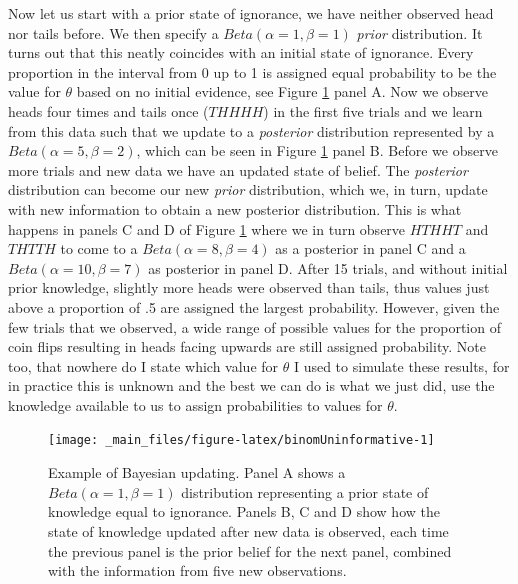 \documentclass[openright,titlepage,12pt,a4paper]{book}
\begin{document}
Now let us start with a prior state of ignorance, we have neither observed head nor tails before. We then specify a \(Beta(\alpha = 1, \beta = 1)\) \emph{prior} distribution. It turns out that this neatly coincides with an initial state of ignorance. Every proportion in the interval from 0 up to 1 is assigned equal probability to be the value for \(\theta\) based on no initial evidence, see Figure \ref{fig:binomUninformative} panel A. Now we observe heads four times and tails once (\(THHHH\)) in the first five trials and we learn from this data such that we update to a \emph{posterior} distribution represented by a \(Beta(\alpha = 5, \beta = 2)\), which can be seen in Figure \ref{fig:binomUninformative} panel B. Before we observe more trials and new data we have an updated state of belief. The \emph{posterior} distribution can become our new \emph{prior} distribution, which we, in turn, update with new information to obtain a new posterior distribution. This is what happens in panels C and D of Figure \ref{fig:binomUninformative} where we in turn observe \(HTHHT\) and \(THTTH\) to come to a \(Beta(\alpha = 8, \beta = 4)\) as a posterior in panel C and a \(Beta(\alpha = 10, \beta = 7)\) as posterior in panel D. After 15 trials, and without initial prior knowledge, slightly more heads were observed than tails, thus values just above a proportion of .5 are assigned the largest probability. However, given the few trials that we observed, a wide range of possible values for the proportion of coin flips resulting in heads facing upwards are still assigned probability. Note too, that nowhere do I state which value for \(\theta\) I used to simulate these results, for in practice this is unknown and the best we can do is what we just did, use the knowledge available to us to assign probabilities to values for \(\theta\).

\begin{figure}

{\centering \texttt{[image: \_main\_files/figure-latex/binomUninformative-1]} 

}

\caption{Example of Bayesian updating. Panel A shows a $Beta(\alpha = 1, \beta = 1)$ distribution representing a prior state of knowledge equal to ignorance. Panels B, C and D show how the state of knowledge updated after new data is observed, each time the previous panel is the prior belief for the next panel, combined with the information from five new observations.}\label{fig:binomUninformative}
\end{figure}
\end{document}
